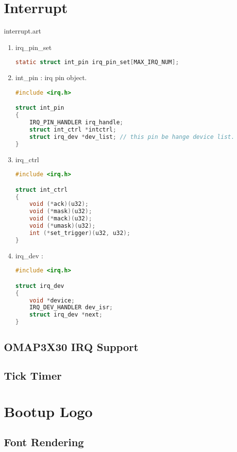 \documentclass[a4paper,11pt]{book}
\begin{document}
\begin{CJK*}{UTF8}{gbsn}
\chapter{Interrupt}
 {interrupt.art}

\begin{enumerate}
\item irq\_pin\_set
\begin{lstlisting}[language=c, numbers=none]
	static struct int_pin irq_pin_set[MAX_IRQ_NUM];
\end{lstlisting}

\item int\_pin : irq pin object.
\begin{lstlisting}[language=c, numbers=none]
#include <irq.h>

struct int_pin
{
	IRQ_PIN_HANDLER irq_handle;
	struct int_ctrl *intctrl;
	struct irq_dev *dev_list; // this pin be hange device list.
}
\end{lstlisting}

\item irq\_ctrl
\begin{lstlisting}[language=c, numbers=none]
#include <irq.h>

struct int_ctrl
{
	void (*ack)(u32);
	void (*mask)(u32);
	void (*mack)(u32);
	void (*umask)(u32);
	int (*set_trigger)(u32, u32);
}
\end{lstlisting}

\item irq\_dev :
\begin{lstlisting}[language=c, numbers=none]
#include <irq.h>

struct irq_dev
{
	void *device;
	IRQ_DEV_HANDLER dev_isr;
	struct irq_dev *next;
}
\end{lstlisting}
\end{enumerate}

\section{OMAP3X30 IRQ Support}

\section{Tick Timer}

\chapter{Bootup Logo}

\section{Font Rendering}


\end{CJK*}
\end{document}
